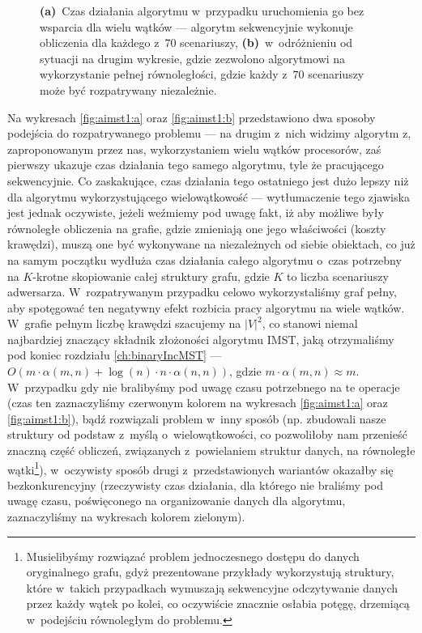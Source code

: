 \begin{figure}[!htbp]
{		 \textbf{(a)}~Czas działania algorytmu w~przypadku uruchomienia go bez wsparcia dla wielu wątków --- algorytm sekwencyjnie wykonuje obliczenia dla każdego z~$70$ scenariuszy,
		 \textbf{(b)}~w~odróżnieniu od sytuacji na drugim wykresie, gdzie zezwolono algorytmowi na wykorzystanie pełnej równoległości, gdzie każdy z~$70$ scenariuszy może być rozpatrywany niezależnie.
	}
	\label{fig:aimst1}
\end{figure}

Na wykresach \ref{fig:aimst1:a} oraz \ref{fig:aimst1:b} przedstawiono dwa sposoby podejścia do rozpatrywanego problemu --- na drugim z~nich widzimy algorytm z, zaproponowanym przez nas, wykorzystaniem wielu wątków procesorów, zaś pierwszy ukazuje czas działania tego samego algorytmu, tyle że pracującego sekwencyjnie. Co zaskakujące, czas działania tego ostatniego jest dużo lepszy niż dla algorytmu wykorzystującego wielowątkowość --- wytłumaczenie tego zjawiska jest jednak oczywiste, jeżeli weźmiemy pod uwagę fakt, iż aby możliwe były równoległe obliczenia na grafie, gdzie zmieniają one jego właściwości (koszty krawędzi), muszą one być wykonywane na niezależnych od siebie obiektach, co już na samym początku wydłuża czas działania całego algorytmu o~czas potrzebny na $K$-krotne skopiowanie całej struktury grafu, gdzie $K$ to liczba scenariuszy adwersarza. W~rozpatrywanym przypadku celowo wykorzystaliśmy graf pełny, aby spotęgować ten negatywny efekt rozbicia pracy algorytmu na wiele wątków. W~grafie pełnym liczbę krawędzi szacujemy na $\left| V \right|^{2}$, co stanowi niemal najbardziej znaczący składnik złożoności algorytmu \textsc{IMST}, jaką otrzymaliśmy pod koniec rozdziału \ref{ch:binaryIncMST} --- $O \left( m \cdot \alpha  \left( m, n \right) + \log \left( n \right) \cdot n \cdot \alpha \left( n, n \right) \right)$, gdzie $m \cdot \alpha  \left( m, n \right) \approx m$. W~przypadku gdy nie bralibyśmy pod uwagę czasu potrzebnego na te operacje (czas ten zaznaczyliśmy czerwonym kolorem na wykresach \ref{fig:aimst1:a} oraz \ref{fig:aimst1:b}), bądź rozwiązali problem w~inny sposób (np. zbudowali nasze struktury od podstaw z~myślą o~wielowątkowości, co pozwoliłoby nam przenieść znaczną część obliczeń, związanych z~powielaniem struktur danych, na równoległe wątki\footnote{Musielibyśmy rozwiązać problem jednoczesnego dostępu do danych oryginalnego grafu, gdyż prezentowane przykłady wykorzystują struktury, które w~takich przypadkach wymuszają sekwencyjne odczytywanie danych przez każdy wątek po kolei, co oczywiście znacznie osłabia potęgę, drzemiącą w~podejściu równoległym do problemu.}), w~oczywisty sposób drugi z~przedstawionych wariantów okazałby się bezkonkurencyjny (rzeczywisty czas działania, dla którego nie braliśmy pod uwagę czasu, poświęconego na organizowanie danych dla algorytmu, zaznaczyliśmy na wykresach kolorem zielonym).

